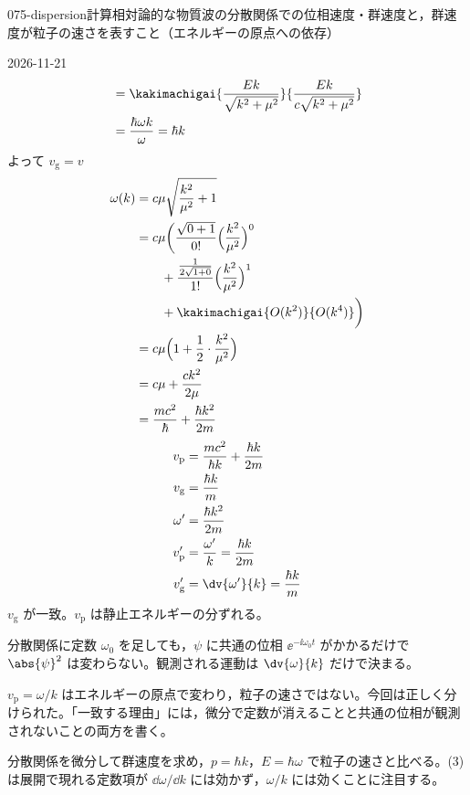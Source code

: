 \documentclass[uplatex,dvipdfmx,a4paper,11pt]{jsarticle}
\begin{document}
\begin{mondai}{075-dispersion}{計算}{相対論的な物質波の分散関係での位相速度・群速度と，群速度が粒子の速さを表すこと（エネルギーの原点への依存）}
\begin{kotaeutsushi}{2026-11-21}
\begin{align*}
&=\kakimachigai{\frac{Ek}{\sqrt{k^{2}+\mu^{2}}}}{\frac{Ek}{c\sqrt{k^{2}+\mu^{2}}}}\\
&=\frac{\hbar\omega k}{\omega}=\hbar k
\end{align*}
よって $v_{\mathrm{g}}=v$
\begin{align*}
\omega(k)&=c\mu\sqrt{\frac{k^{2}}{\mu^{2}}+1}\\
&=c\mu\biggl(\frac{\sqrt{0+1}}{0!}\Bigl(\frac{k^{2}}{\mu^{2}}\Bigr)^{0}\\
&\qquad+\frac{\frac{1}{2\sqrt{1+0}}}{1!}\Bigl(\frac{k^{2}}{\mu^{2}}\Bigr)^{1}\\
&\qquad+\kakimachigai{O(k^{2})}{O(k^{4})}\biggr)\\
&=c\mu\Bigl(1+\frac{1}{2}\cdot\frac{k^{2}}{\mu^{2}}\Bigr)\\
&=c\mu+\frac{ck^{2}}{2\mu}\\
&=\frac{mc^{2}}{\hbar}+\frac{\hbar k^{2}}{2m}
\end{align*}
\begin{align*}
v_{\mathrm{p}}&=\frac{mc^{2}}{\hbar k}+\frac{\hbar k}{2m}\\
v_{\mathrm{g}}&=\frac{\hbar k}{m}\\
\omega'&=\frac{\hbar k^{2}}{2m}\\
v_{\mathrm{p}}'&=\frac{\omega'}{k}=\frac{\hbar k}{2m}\\
v_{\mathrm{g}}'&=\dv{\omega'}{k}=\frac{\hbar k}{m}
\end{align*}
$v_{\mathrm{g}}$ が一致。$v_{\mathrm{p}}$ は静止エネルギーの分ずれる。
\end{kotaeutsushi}
\begin{kizuki}
\item 分散関係に定数 $\omega_{0}$ を足しても，$\psi$ に共通の位相 $\ee^{-\ii\omega_{0}t}$ がかかるだけで $\abs{\psi}^{2}$ は変わらない。観測される運動は $\dv{\omega}{k}$ だけで決まる。
\item {} $v_{\mathrm{p}}=\omega/k$ はエネルギーの原点で変わり，粒子の速さではない。今回は正しく分けられた。「一致する理由」には，微分で定数が消えることと共通の位相が観測されないことの両方を書く。
\end{kizuki}
\begin{tadashii}
\houshin 分散関係を微分して群速度を求め，$p=\hbar k$，$E=\hbar\omega$ で粒子の速さと比べる。(3) は展開で現れる定数項が $\dd\omega/\dd k$ には効かず，$\omega/k$ には効くことに注目する。

\end{tadashii}
\end{mondai}
\end{document}
